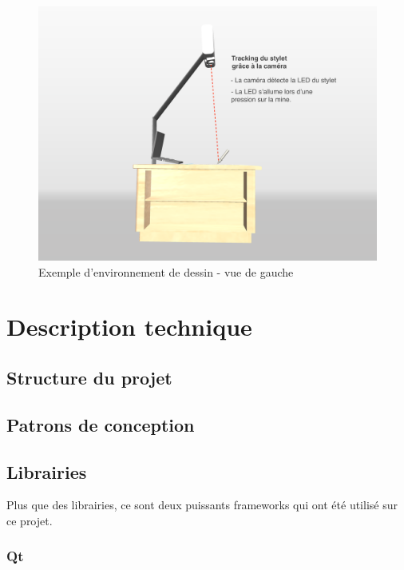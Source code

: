 \documentclass[11pt,a4paper,oldfontcommands]{memoir}
\begin{document}
\newpage

\begin{figure}[h]
\centering
\includegraphics[angle=90, scale=0.15]{images/drawing-environment-side.png}
\caption{Exemple d'environnement de dessin - vue de gauche}
\end{figure}


\chapter{Description technique}

\section{Structure du projet}

\section{Patrons de conception}

\section{Librairies}

Plus que des librairies, ce sont deux puissants frameworks qui ont été utilisé sur ce projet.

\subsection{Qt}
\end{document}
